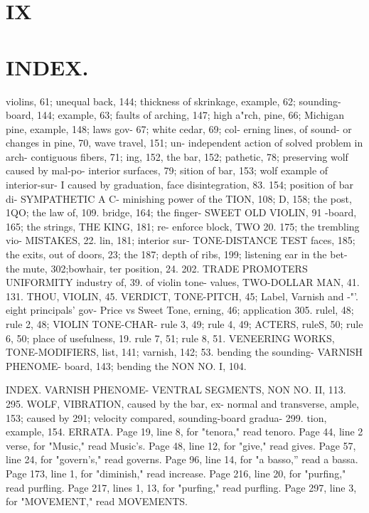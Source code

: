 \documentclass{article}
\begin{document}
\section*{IX}
\section*{INDEX.}
violins, 61; unequal back, 144; thickness of skrinkage, example, 62; sounding-board, 144; example, 63; faults of arching, 147; high a"rch, pine, 66; Michigan pine, example, 148; laws gov- 67; white cedar, 69; col- erning lines, of sound- or changes in pine, 70, wave travel, 151; un- independent action of solved problem in arch- contiguous fibers, 71; ing, 152, the bar, 152; pathetic, 78; preserving wolf caused by mal-po- interior surfaces, 79; sition of bar, 153; wolf example of interior-sur- I caused by graduation, face disintegration, 83. 154; position of bar di- SYMPATHETIC A C- minishing power of the TION, 108; D, 158; the post, 1QO; the law of, 109. bridge, 164; the finger- SWEET OLD VIOLIN, 91 -board, 165; the strings, THE KING, 181; re- enforce block, TWO 20. 175; the trembling vio- MISTAKES, 22. lin, 181; interior sur- TONE-DISTANCE TEST faces, 185; the exits, out of doors, 23; the 187; depth of ribs, 199; listening ear in the bet- the mute, 302;bowhair, ter position, 24. 202. TRADE PROMOTERS UNIFORMITY industry of, 39. of violin tone- values, TWO-DOLLAR MAN, 41. 131. THOU, VIOLIN, 45. VERDICT, TONE-PITCH, 45; Label, Varnish and -"'. eight principals' gov- Price vs Sweet Tone, erning, 46; application 305. rulel, 48; rule 2, 48; VIOLIN TONE-CHAR- rule 3, 49; rule 4, 49; ACTERS, ruleS, 50; rule 6, 50; place of usefulness, 19. rule 7, 51; rule 8, 51. VENEERING WORKS, TONE-MODIFIERS, list, 141; varnish, 142; 53. bending the sounding- VARNISH PHENOME- board, 143; bending the NON NO. I, 104.

INDEX. VARNISH PHENOME- VENTRAL SEGMENTS, NON NO. II, 113. 295. WOLF, VIBRATION, caused by the bar, ex- normal and transverse, ample, 153; caused by 291; velocity compared, sounding-board gradua- 299. tion, example, 154. ERRATA. Page 19, line 8, for "tenora," read tenoro. Page 44, line 2 verse, for "Music," read Music's. Page 48, line 12, for "give," read gives. Page 57, line 24, for "govern's," read governs. Page 96, line 14, for "a basso,'' read a bassa. Page 173, line 1, for "diminish," read increase. Page 216, line 20, for "purfing," read purfling. Page 217, lines 1, 13, for "purfing," read purfling. Page 297, line 3, for "MOVEMENT," read MOVEMENTS.
\end{document}
